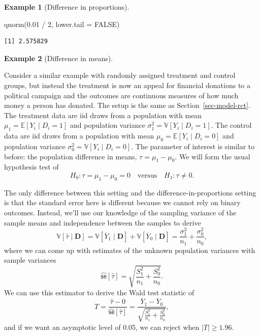\documentclass[
  13pt,
  letterpaper,
  DIV=11,
  numbers=noendperiod]{scrreprt}
\newenvironment{Shaded}{\begin{snugshade}}{\end{snugshade}}
\newcommand{\AttributeTok}[1]{\textcolor[rgb]{0.40,0.45,0.13}{#1}}
\newcommand{\ConstantTok}[1]{\textcolor[rgb]{0.56,0.35,0.01}{#1}}
\newcommand{\DecValTok}[1]{\textcolor[rgb]{0.68,0.00,0.00}{#1}}
\newcommand{\FloatTok}[1]{\textcolor[rgb]{0.68,0.00,0.00}{#1}}
\newcommand{\FunctionTok}[1]{\textcolor[rgb]{0.28,0.35,0.67}{#1}}
\newcommand{\NormalTok}[1]{\textcolor[rgb]{0.00,0.23,0.31}{#1}}
\newcommand{\SpecialCharTok}[1]{\textcolor[rgb]{0.37,0.37,0.37}{#1}}
\newcommand{\E}{\mathbb{E}}
\newcommand{\V}{\mathbb{V}}
\newcommand{\se}{\textsf{se}}
\newcommand{\Ybar}{\overline{Y}}
\theoremstyle{plain}
\theoremstyle{plain}
\theoremstyle{definition}
\theoremstyle{definition}
\newtheorem{example}{Example}[chapter]
\theoremstyle{remark}
\begin{document}
\begin{example}[Difference in
proportions]
\begin{Shaded}
\begin{Highlighting}[]
\FunctionTok{qnorm}\NormalTok{(}\FloatTok{0.01} \SpecialCharTok{/} \DecValTok{2}\NormalTok{, }\AttributeTok{lower.tail =} \ConstantTok{FALSE}\NormalTok{)}
\end{Highlighting}
\end{Shaded}

\begin{verbatim}
[1] 2.575829
\end{verbatim}

\end{example}

\begin{example}[Difference in
means]\protect\hypertarget{exm-diff-in-means}{}\label{exm-diff-in-means}

Consider a similar example with randomly assigned treatment and control
groups, but instead the treatment is now an appeal for financial
donations to a political campaign and the outcomes are continuous
measures of how much money a person has donated. The setup is the same
as Section~\ref{sec-model-rct}. The treatment data are iid draws from a
population with mean \(\mu_1 = \E[Y_i \mid D_i = 1]\) and population
variance \(\sigma^2_1 = \V[Y_i \mid D_i = 1]\). The control data are iid
draws from a population with mean \(\mu_0 = \E[Y_i \mid D_i = 0]\) and
population variance \(\sigma^2_0 = \V[Y_i \mid D_i = 0]\). The parameter
of interest is similar to before: the population difference in means,
\(\tau = \mu_1 - \mu_0\). We will form the usual hypothesis test of \[ 
H_0: \tau = \mu_1 - \mu_0 = 0 \quad\text{versus}\quad H_1: \tau \neq 0.
\]

The only difference between this setting and the
difference-in-proportions setting is that the standard error here is
different because we cannot rely on binary outcomes. Instead, we'll use
our knowledge of the sampling variance of the sample means and
independence between the samples to derive \[
\V[\widehat{\tau} \mid \mathbf{D}] = \V[\Ybar_1 \mid \mathbf{D}] + \V[\Ybar_0 \mid \mathbf{D}] = \frac{\sigma^2_1}{n_1} + \frac{\sigma^2_0}{n_0},
\] where we can come up with estimates of the unknown population
variances with sample variances \[
\widehat{\se}[\widehat{\tau}] = \sqrt{\frac{S^2_1}{n_1} + \frac{S^2_0}{n_0}}.
\] We can use this estimator to derive the Wald test statistic of \[ 
T = \frac{\widehat{\tau} - 0}{\widehat{\se}[\widehat{\tau}]} = \frac{\Ybar_1 - \Ybar_0}{\sqrt{\frac{S^2_1}{n_1} + \frac{S^2_0}{n_0}}},
\] and if we want an asymptotic level of 0.05, we can reject when
\(|T| \geq 1.96\).

\end{example}
\end{document}
